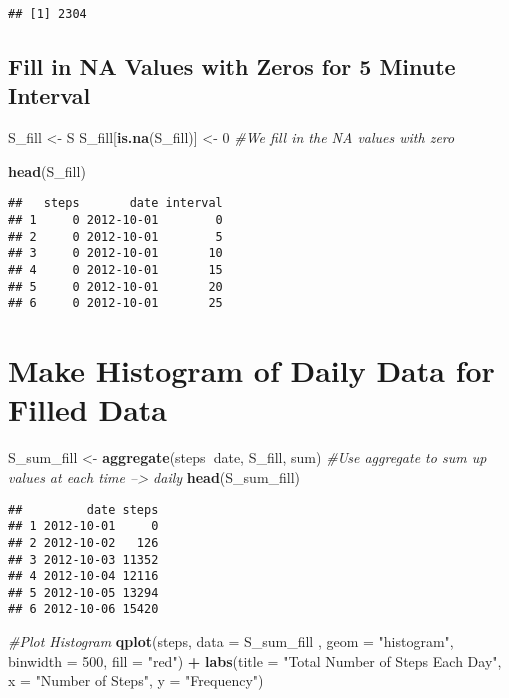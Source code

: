 \documentclass[]{article}
\newenvironment{Shaded}{\begin{snugshade}}{\end{snugshade}}
\newcommand{\KeywordTok}[1]{\textcolor[rgb]{0.13,0.29,0.53}{\textbf{#1}}}
\newcommand{\DataTypeTok}[1]{\textcolor[rgb]{0.13,0.29,0.53}{#1}}
\newcommand{\DecValTok}[1]{\textcolor[rgb]{0.00,0.00,0.81}{#1}}
\newcommand{\StringTok}[1]{\textcolor[rgb]{0.31,0.60,0.02}{#1}}
\newcommand{\CommentTok}[1]{\textcolor[rgb]{0.56,0.35,0.01}{\textit{#1}}}
\newcommand{\OperatorTok}[1]{\textcolor[rgb]{0.81,0.36,0.00}{\textbf{#1}}}
\newcommand{\NormalTok}[1]{#1}
\begin{document}
\begin{verbatim}
## [1] 2304
\end{verbatim}

\subsection{Fill in NA Values with Zeros for 5 Minute
Interval}\label{fill-in-na-values-with-zeros-for-5-minute-interval}

\begin{Shaded}
\begin{Highlighting}[]
\NormalTok{S_fill <-}\StringTok{ }\NormalTok{S}
\NormalTok{S_fill[}\KeywordTok{is.na}\NormalTok{(S_fill)] <-}\StringTok{ }\DecValTok{0} \CommentTok{#We fill in the NA values with zero}

\KeywordTok{head}\NormalTok{(S_fill)}
\end{Highlighting}
\end{Shaded}

\begin{verbatim}
##   steps       date interval
## 1     0 2012-10-01        0
## 2     0 2012-10-01        5
## 3     0 2012-10-01       10
## 4     0 2012-10-01       15
## 5     0 2012-10-01       20
## 6     0 2012-10-01       25
\end{verbatim}

\section{Make Histogram of Daily Data for Filled
Data}\label{make-histogram-of-daily-data-for-filled-data}

\begin{Shaded}
\begin{Highlighting}[]
\NormalTok{S_sum_fill <-}\StringTok{ }\KeywordTok{aggregate}\NormalTok{(steps}\OperatorTok{~}\NormalTok{date, S_fill, sum) }\CommentTok{#Use aggregate to sum up values at each time --> daily}
\KeywordTok{head}\NormalTok{(S_sum_fill)}
\end{Highlighting}
\end{Shaded}

\begin{verbatim}
##         date steps
## 1 2012-10-01     0
## 2 2012-10-02   126
## 3 2012-10-03 11352
## 4 2012-10-04 12116
## 5 2012-10-05 13294
## 6 2012-10-06 15420
\end{verbatim}

\begin{Shaded}
\begin{Highlighting}[]
\CommentTok{#Plot Histogram}
\KeywordTok{qplot}\NormalTok{(steps, }\DataTypeTok{data =}\NormalTok{ S_sum_fill , }\DataTypeTok{geom =} \StringTok{"histogram"}\NormalTok{, }\DataTypeTok{binwidth =} \DecValTok{500}\NormalTok{, }\DataTypeTok{fill =} \StringTok{"red"}\NormalTok{)  }\OperatorTok{+}\StringTok{ }
\StringTok{    }\KeywordTok{labs}\NormalTok{(}\DataTypeTok{title =} \StringTok{"Total Number of Steps Each Day"}\NormalTok{, }\DataTypeTok{x =} \StringTok{"Number of Steps"}\NormalTok{, }\DataTypeTok{y =} \StringTok{"Frequency"}\NormalTok{)}
\end{Highlighting}
\end{Shaded}
\end{document}
